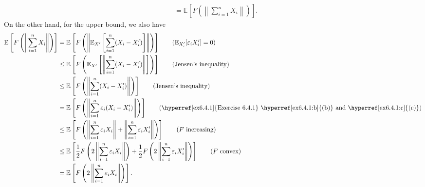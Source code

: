 \begin{answer}
\begin{align*}
		 & = \mathbb{E}_{}\left[F \left( \left\lVert \sum_{i=1}^{n} X_i \right\rVert \right) \right].
	\end{align*}
	On the other hand, for the upper bound, we also have
	\begin{align*}
		\mathbb{E}_{}\left[F \left( \left\lVert \sum_{i=1}^{n} X_i \right\rVert \right) \right]
		 & = \mathbb{E}_{}\left[F \left( \left\lVert \mathbb{E}_{X^{\prime} }\left[ \sum_{i=1}^{n} (X_i - X_i^{\prime} ) \right] \right\rVert \right) \right] \tag*{(\(\mathbb{E}_{X^{\prime}_i }[\varepsilon _i X_i^{\prime} ] = 0 \))}                       \\
		 & \leq \mathbb{E}_{}\left[F \left( \mathbb{E}_{X^{\prime} }\left[ \left\lVert \sum_{i=1}^{n} (X_i - X_i^{\prime} ) \right\rVert \right] \right) \right] \tag*{(Jensen's inequality)}                                                                  \\
		 & \leq \mathbb{E}_{}\left[F \left( \left\lVert \sum_{i=1}^{n} (X_i - X_i^{\prime} ) \right\rVert \right) \right] \tag*{(Jensen's inequality)}                                                                                                         \\
		 & = \mathbb{E}_{}\left[F \left( \left\lVert \sum_{i=1}^{n} \varepsilon _i (X_i - X_i^{\prime} ) \right\rVert \right) \right] \tag*{(\hyperref[ex6.4.1]{Exercise 6.4.1} \hyperref[ex6.4.1:b]{(b)} and \hyperref[ex6.4.1:c]{(c)})}                      \\
		 & \leq \mathbb{E}_{}\left[F \left( \left\lVert \sum_{i=1}^{n} \varepsilon _i X_i \right\rVert + \left\lVert \sum_{i=1}^{n} \varepsilon _i X_i^{\prime} \right\rVert \right) \right] \tag*{(\(F\) increasing)}                                         \\
		 & \leq \mathbb{E}_{}\left[\frac{1}{2} F \left( 2 \left\lVert \sum_{i=1}^{n} \varepsilon _i X_i \right\rVert \right) + \frac{1}{2} F\left( 2 \left\lVert \sum_{i=1}^{n} \varepsilon _i X_i^{\prime} \right\rVert \right) \right] \tag*{(\(F\) convex)} \\
		 & = \mathbb{E}_{}\left[F \left( 2 \left\lVert \sum_{i=1}^{n} \varepsilon _i X_i \right\rVert \right) \right].
	\end{align*}
\end{answer}

